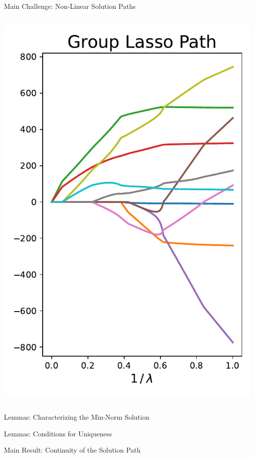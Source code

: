 \documentclass[usenames,dvipsnames,mathserif,notheorems]{beamer}
\begin{document}
\begin{frame}{Main Challenge: Non-Linear Solution Paths}
\begin{columns}
\begin{column}{0.5\textwidth}
			\includegraphics[width=\textwidth]{assets/group_lasso_path.pdf}
		\end{column}
	\end{columns}

\end{frame}


\begin{frame}{Lemmas: Characterizing the Min-Norm Solution}

\end{frame}


\begin{frame}{Lemmas: Conditions for Uniqueness}

\end{frame}


\begin{frame}{Main Result: Continuity of the Solution Path}

\end{frame}
\end{document}
